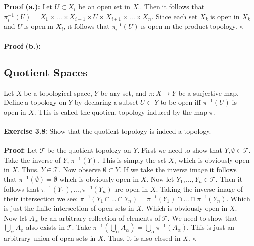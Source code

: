 \documentclass{article}
\begin{document}
  \textbf{Proof (a.):} Let $U\subset X_i$ be an open set in $X_i$. Then it follows that $\pi_i^{-1}(U)=X_1\times ...\times X_{i-1}\times U\times X_{i+1}\times...\times X_n$. Since each set $X_k$ is open in $X_k$ and $U$ is open in $X_i$, it follows that $\pi_i^{-1}(U)$ is open in the product topology. $\square$.\\
  \\
  \textbf{Proof (b.):}\\


  \subsection{Quotient Spaces}
  Let $X$ be a topological space, $Y$ be any set, and $\pi:X\to Y$ be a surjective map. Define a topology on $Y$ by declaring a subset $U\subset Y$ to be open iff $\pi^{-1}(U)$ is open in $X$. This is called the quotient topology induced by the map $\pi$.\\
  \\
  \textbf{Exercise 3.8:} Show that the quotient topology is indeed a topology.\\
  \\
  \textbf{Proof:} Let $\mathcal{T}$ be the quotient topology on $Y$. First we need to show that $Y,\emptyset\in\mathcal{T}$. Take the inverse of $Y$, $\pi^{-1}(Y)$. This is simply the set $X$, which is obviously open in $X$. Thus, $Y\in\mathcal{T}$. Now observe $\emptyset\subset Y$. If we take the inverse image it follows that $\pi^{-1}(\emptyset)=\emptyset$ which is obviously open in $X$. Now let $Y_1,...,Y_n\in\mathcal{T}$. Then it follows that $\pi^{-1}(Y_1),...,\pi^{-1}(Y_n)$ are open in $X$. Taking the inverse image of their intersection we see: $\pi^{-1}(Y_1\cap...\cap Y_n)=\pi^{-1}(Y_1)\cap...\cap\pi^{-1}(Y_n)$. Which is just the finite intersection of open sets in $X$. Which is obviously open in $X$. Now let $A_\alpha$ be an arbitrary collection of elements of $\mathcal{T}$. We need to show that $\bigcup_\alpha A_\alpha$ also exists in $\mathcal{T}$. Take $\pi^{-1}(\bigcup_\alpha A_\alpha)=\bigcup_\alpha\pi^{-1}(A_\alpha)$. This is just an arbitrary union of open sets in $X$. Thus, it is also closed in $X$. $\square$.\\
  \\
\end{document}
